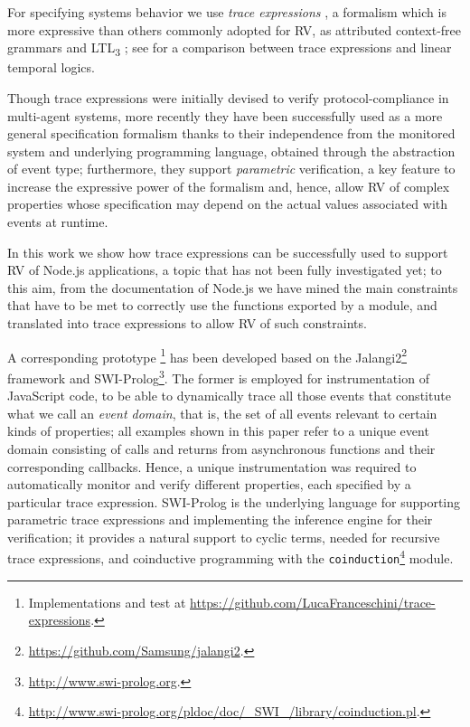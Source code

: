 For specifying systems behavior we use \emph{trace expressions} \cite{ancona2016comparing}, a formalism which is more expressive than others
commonly adopted for RV, as
attributed context-free grammars \cite{de2014combining} and LTL\textsubscript{3} \cite{ltl3}; see \cite{AnconaFM16} for a comparison between trace expressions and linear temporal logics.

Though trace expressions were initially devised to verify protocol-compliance in multi-agent systems, more recently they have been successfully
used as a more general specification formalism \cite{ParametricJava17, TowardsIoT17} thanks to their independence from the monitored system and underlying programming language, obtained through the abstraction of event type;
furthermore, they support \emph{parametric} verification, a key feature to increase the expressive power of the formalism and, hence, allow RV of complex properties whose specification may depend on the actual values associated with events at runtime.

In this work we show how trace expressions can be successfully used to support RV of Node.js applications, a topic that has not
been fully investigated yet;  to this aim, from the documentation of Node.js we have mined the main constraints that have
to be met to correctly use the functions exported by a module, and translated into trace expressions to allow RV of
such constraints. 

A corresponding prototype
\footnote{Implementations and test at \url{https://github.com/LucaFranceschini/trace-expressions}.}
has been developed based on the Jalangi2\footnote{\url{https://github.com/Samsung/jalangi2}.}
framework and SWI-Prolog\footnote{\url{http://www.swi-prolog.org}.}.
The former is employed for instrumentation of JavaScript code, to be able
to dynamically trace all those events that constitute what we call an \emph{event domain}, that is, the set
of all events relevant to certain kinds of properties;
all examples shown in this paper refer to a unique event domain consisting of calls and returns
from asynchronous functions and their corresponding callbacks. Hence, a unique instrumentation
was required to automatically monitor and verify different properties, each specified by a particular trace expression.
SWI-Prolog is the underlying language for supporting parametric
trace expressions and implementing the inference engine for their verification; it provides
a natural support to cyclic terms, needed for recursive trace expressions, and coinductive
programming with the \lstinline{coinduction}\footnote{\url{http://www.swi-prolog.org/pldoc/doc/_SWI_/library/coinduction.pl}.}
module. 

